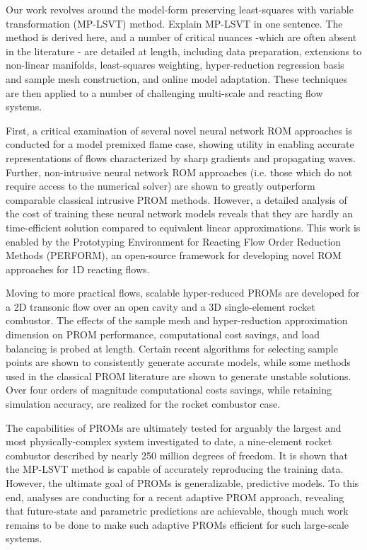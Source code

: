 Our work revolves around the  model-form preserving least-squares with variable transformation (MP-LSVT) method. {\color{red} Explain MP-LSVT in one sentence}. The method is derived here, and a number of critical nuances -which are often absent in the literature - are detailed at length, including data preparation, extensions to non-linear manifolds, least-squares weighting, hyper-reduction regression basis and sample mesh construction, and online model adaptation. These techniques are then applied to a number of challenging multi-scale and reacting flow systems.

First, a critical examination of several novel neural network ROM approaches is conducted for a model premixed flame case, showing  utility in enabling  accurate representations of flows characterized by sharp gradients and propagating waves. Further, non-intrusive neural network ROM approaches (i.e. those which do not require access to the numerical solver) are shown to greatly outperform comparable classical intrusive PROM methods. However, a detailed analysis of the cost of training these neural network models reveals that they are hardly an time-efficient solution compared to equivalent linear approximations. This work is enabled by the Prototyping Environment for Reacting Flow Order Reduction Methods (PERFORM), an open-source framework for developing novel ROM approaches for 1D reacting flows.

Moving to more practical flows, scalable hyper-reduced PROMs are developed for a 2D transonic flow over an open cavity and a 3D single-element rocket combustor. The effects of the sample mesh and hyper-reduction approximation dimension on PROM performance, computational cost savings, and load balancing is probed at length. Certain recent algorithms for selecting sample points are shown to consistently generate accurate models, while some methods used in the classical PROM literature are shown to generate unstable solutions. Over four orders of magnitude computational costs savings, while retaining simulation accuracy, are realized for the rocket combustor case.

The capabilities of PROMs are ultimately tested for arguably the largest and most physically-complex system investigated to date, a nine-element rocket combustor described by nearly 250 million degrees of freedom. It is shown that the MP-LSVT method is capable of accurately reproducing the training data. However, the ultimate goal of PROMs is generalizable, predictive models. To this end, analyses are conducting for a recent adaptive PROM approach, revealing that future-state and parametric predictions are achievable, though much work remains to be done to make such adaptive PROMs efficient for such large-scale systems.

